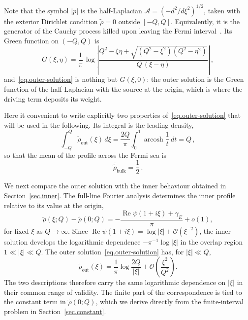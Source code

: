 \documentclass[11pt,a4paper]{article}
\theoremstyle{definition}
\begin{document}
Note that the symbol $|p|$ is the half-Laplacian
$\mathcal{A} = (-d^2/d\xi^2)^{1/2}$, taken with the exterior Dirichlet condition
$\tilde\rho = 0$ outside $[-Q,Q]$. Equivalently, it is the generator of the
Cauchy process killed upon leaving the Fermi interval~\cite{BanuelosKulczycki2004, KulczyckiKwasnickiMaleckiStos2010}.
Its Green function on $(-Q,Q)$ is 
\begin{equation}\label{eq.green}
  G(\xi,\eta) = \frac{1}{\pi}\,
  \log\left|\frac{Q^2 - \xi\eta
    + \sqrt{(Q^2-\xi^2)(Q^2-\eta^2)}}{Q\,(\xi-\eta)}\right|\,,
\end{equation}
and~\eqref{eq.outer-solution} is nothing but $G(\xi,0)$: the outer solution is
the Green function of the half-Laplacian with the source at the origin, which is
where the driving term deposits its weight.   

Here it convenient to write explicitly two properties of~\eqref{eq.outer-solution} that will be used in the following.  Its
integral is the leading density,
\begin{equation}\label{eq.outer-integral}
  \int_{-Q}^{Q}\tilde\rho_{\mathrm{out}}(\xi)\,d\xi
  = \frac{2Q}{\pi}\int_0^{1}\operatorname{arcosh}\frac{1}{t}\,dt
   = Q\,,
\end{equation}
so that the mean of the profile across the Fermi sea is
\begin{equation}\label{eq.bulk-value}
  \bar{\tilde\rho}_{\mathrm{bulk}} = \frac{1}{2}\,.
\end{equation}





We next compare the outer solution with the inner behaviour obtained in
Section~\ref{sec.inner}.  The full-line Fourier analysis determines the inner
profile relative to its value at the origin,
\begin{equation}\label{eq.inner-profile-relative}
\tilde\rho(\xi;Q)-\tilde\rho(0;Q)
=
-\frac{\operatorname{Re}\psi(1+i\xi)+\gamma_E}{\pi}
+o(1),
\end{equation}
for fixed $\xi$ as $Q\to\infty$.  Since
$\operatorname{Re}\psi(1+i\xi)=\log|\xi|+\mathcal O(\xi^{-2})$, the inner
solution develops the logarithmic dependence $-\pi^{-1}\log|\xi|$ in the overlap
region $1\ll|\xi|\ll Q$.  The outer solution~\eqref{eq.outer-solution} has, for
$|\xi|\ll Q$,
\begin{equation}\label{eq:outer-local}
\tilde\rho_{\mathrm{out}}(\xi)
=
\frac{1}{\pi}\log\frac{2Q}{|\xi|}
+\mathcal O\left(\frac{\xi^2}{Q^2}\right).
\end{equation}
The two descriptions therefore carry the same logarithmic
dependence on $|\xi|$ in their common range of validity. 
The finite part of the correspondence is tied to the constant term in $\tilde\rho(0;Q)$, which we derive  directly from the finite-interval problem in Section~\ref{sec.constant}.
\end{document}
